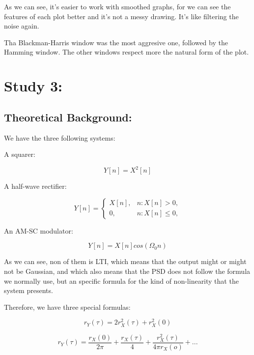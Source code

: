 \documentclass[a4paper,11pt]{article}
\begin{document}
As we can see, it's easier to work with smoothed graphs, for we can see the features of each plot better and it's not a messy drawing.
It's like filtering the noise again.

Tha Blackman-Harris window was the most aggresive one, followed by the Hamming window. The other windows respect more the natural form of the plot.

\newpage

\section{Study 3:}

\subsection{Theoretical Background:}

We have the three following systems:

A squarer:

\begin{equation}
  Y[n] =X^2[n]
\end{equation}

A half-wave rectifier:

\begin{equation}
  Y[n] =
    \begin{cases}
        X[n],& n: X[n]>0,\\
        0,    & n: X[n] \leq 0,
    \end{cases}
\end{equation}

An AM-SC modulator:

\begin{equation}
  Y[n] =X[n]cos(\Omega_{0} n)
\end{equation}

As we can see, non of them is LTI, which means that the output might or might not be Gaussian, and which also means that the PSD does not follow the formula we normally use, but an specific formula for the kind of non-linearity that the system presents.

Therefore, we have three special formulas:

\begin{equation}
  r_Y(\tau) = 2r_X^2(\tau) + r_X^2(0)
\end{equation}

\begin{equation}
  r_Y(\tau) = \frac{r_X(0)}{2\pi} + \frac{r_X(\tau)}{4} + \frac{r_X^2(\tau)}{4\pi r_X(o)} + ...
\end{equation}
\end{document}

